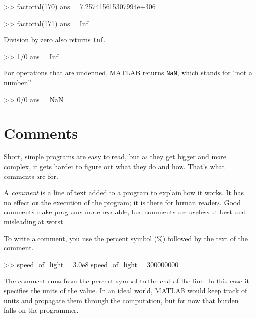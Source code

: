 
\begin{code}
>> factorial(170)
ans = 7.257415615307994e+306

>> factorial(171)
ans = Inf
\end{code}

Division by zero also returns \lstinline{Inf}.

\begin{code}
>> 1/0
ans = Inf
\end{code}


For operations that are undefined, MATLAB returns \lstinline{NaN},
which stands for ``not a number.''


\begin{code}
>> 0/0
ans = NaN
\end{code}


\section{Comments}

Short, simple programs are easy to read, but as they get bigger and more complex, it gets harder to figure out what they do and how.  That's what comments are for.

A \emph{comment} is a line of text added to a program to explain how it works. It has no effect on the execution of the program; it is there for human readers.
Good comments make programs more readable; bad comments are useless at best and misleading at worst.

To write a comment, you use the percent symbol (\%) followed by the text of the comment.


\begin{code}
>> speed_of_light = 3.0e8     %
speed_of_light = 300000000
\end{code}

The comment runs from the percent symbol to the end of the line.
In this case it specifies the units of the value.  In an ideal world,
MATLAB would keep track of units and propagate them through the
computation, but for now that burden falls on the programmer.



